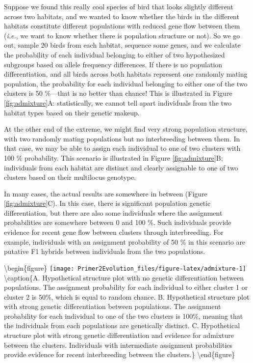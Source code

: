 \documentclass[
]{book}
\begin{document}
Suppose we found this really cool species of bird that looks slightly different across two habitats, and we wanted to know whether the birds in the different habitats constitute different populations with reduced gene flow between them (\emph{i.e.}, we want to know whether there is population structure or not). So we go out, sample 20 birds from each habitat, sequence some genes, and we calculate the probability of each individual belonging to either of two hypothesized subgroups based on allele frequency differences. If there is no population differentiation, and all birds across both habitats represent one randomly mating population, the probability for each individual belonging to either one of the two clusters is 50 \%---that is no better than chance! This is illustrated in Figure \ref{fig:admixture}A: statistically, we cannot tell apart individuals from the two habitat types based on their genetic makeup.

At the other end of the extreme, we might find very strong population structure, with two randomly mating populations but no interbreeding between them. In that case, we may be able to assign each individual to one of two clusters with 100 \% probability. This scenario is illustrated in Figure \ref{fig:admixture}B; individuals from each habitat are distinct and clearly assignable to one of two clusters based on their multilocus genotype.

In many cases, the actual results are somewhere in between (Figure \ref{fig:admixture}C). In this case, there is significant population genetic differentiation, but there are also some individuals where the assignment probabilities are somewhere between 0 and 100 \%. Such individuals provide evidence for recent gene flow between clusters through interbreeding. For example, individuals with an assignment probability of 50 \% in this scenario are putative F1 hybrids between individuals from the two populations.

\textbackslash begin\{figure\}
\texttt{[image: Primer2Evolution\_files/figure-latex/admixture-1]} \textbackslash caption\{A. Hypothetical structure plot with no genetic differentiation between populations. The assignment probability for each individual to either cluster 1 or cluster 2 is 50\%, which is equal to random chance. B. Hypothetical structure plot with strong genetic differentiation between populations. The assignment probability for each individual to one of the two clusters is 100\%, meaning that the individuals from each populations are genetically distinct. C. Hypothetical structure plot with strong genetic differentiation and evidence for admixture between the clusters. Individuals with intermediate assignment probabilities provide evidence for recent interbreeding between the clusters.\}\label{fig:admixture}
\textbackslash end\{figure\}
\end{document}
